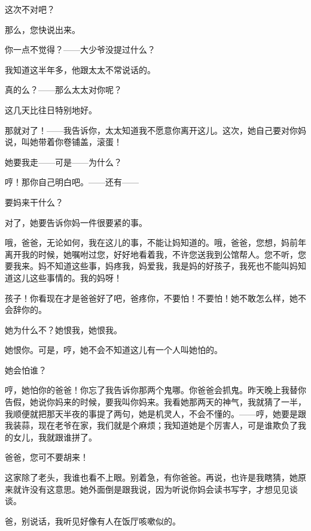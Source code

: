 这次不对吧？

那么，您快说出来。

你一点不觉得？——大少爷没提过什么？

我知道这半年多，他跟太太不常说话的。

真的么？——那么太太对你呢？

这几天比往日特别地好。

那就对了！——我告诉你，太太知道我不愿意你离开这儿。这次，她自己要对你妈说，叫她带着你卷铺盖，滚蛋！

她要我走——可是——为什么？

哼！那你自己明白吧。——还有——

要妈来干什么？

对了，她要告诉你妈一件很要紧的事。

哦，爸爸，无论如何，我在这儿的事，不能让妈知道的。哦，爸爸，您想，妈前年离开我的时候，她嘱咐过您，好好地看着我，不许您送我到公馆帮人。您不听，您要我来。妈不知道这些事，妈疼我，妈爱我，我是妈的好孩子，我死也不能叫妈知道这儿这些事情的。我的妈呀！

孩子！你看现在才是爸爸好了吧，爸疼你，不要怕！不要怕！她不敢怎么样，她不会辞你的。

她为什么不？她恨我，她恨我。

她恨你。可是，哼，她不会不知道这儿有一个人叫她怕的。

她会怕谁？

哼，她怕你的爸爸！你忘了我告诉你那两个鬼哪。你爸爸会抓鬼。昨天晚上我替你告假，她说你妈来的时候，要我叫你妈来。我看她那两天的神气，我就猜了一半，我顺便就把那天半夜的事提了两句，她是机灵人，不会不懂的。——哼，她要是跟我装蒜，现在老爷在家，我们就是个麻烦；我知道她是个厉害人，可是谁欺负了我的女儿，我就跟谁拼了。

爸爸，您可不要胡来！

这家除了老头，我谁也看不上眼。别着急，有你爸爸。再说，也许是我瞎猜，她原来就许没有这意思。她外面倒是跟我说，因为听说你妈会读书写字，才想见见谈谈。

爸，别说话，我听见好像有人在饭厅咳嗽似的。


